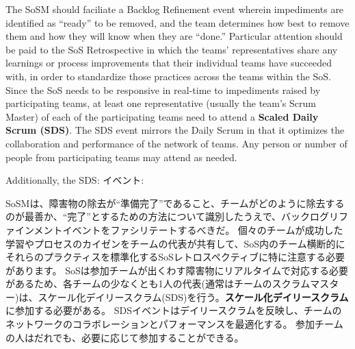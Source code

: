 \documentclass[12pt,a4paper,parskip=full]{scrartcl}
\begin{document}
The SoSM should faciliate a Backlog Refinement event wherein impediments are identified as ``ready'' to be removed, and the team determines how best to remove them and how they will know when they are ``done.''
Particular attention should be paid to the SoS Retrospective in which the teams' representatives share any learnings or process improvements that their individual teams have succeeded with, in order to standardize those practices across the teams within the SoS.  Since the SoS needs to be responsive in real-time to impediments raised by participating teams, at least one representative (usually the team's Scrum Master) of each of the participating teams need to attend a \textbf{Scaled Daily Scrum (SDS)}. The SDS event mirrors the Daily Scrum in that it optimizes the collaboration and performance of the network of teams. Any person or number of people from participating teams may attend as needed.

Additionally, the SDS:
\fi
イベント:

SoSMは、障害物の除去が``準備完了''であること、チームがどのように除去するのが最善か、``完了''とするための方法について識別したうえで、バックログリファインメントイベントをファシリテートするべきだ。
個々のチームが成功した学習やプロセスのカイゼンをチームの代表が共有して、SoS内のチーム横断的にそれらのプラクティスを標準化するSoSレトロスペクティブに特に注意する必要があります。
SoSは参加チームが出くわす障害物にリアルタイムで対応する必要があるため、各チームの少なくとも1人の代表(通常はチームのスクラムマスター)は、スケール化デイリースクラム(SDS)を行う。\textbf{スケール化デイリースクラム}に参加する必要がある。
SDSイベントはデイリースクラムを反映し、チームのネットワークのコラボレーションとパフォーマンスを最適化する。
参加チームの人はだれでも、必要に応じて参加することができる。
\end{document}
